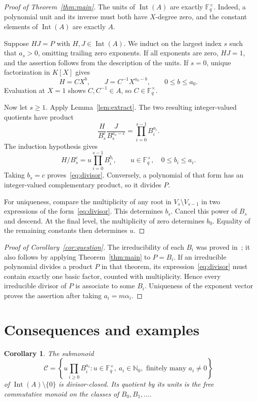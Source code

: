 \documentclass[11pt]{article}
\newtheorem{corollary}[theorem]{Corollary}
\theoremstyle{remark}
\newcommand{\Int}{\operatorname{Int}}
\newcommand{\F}{\mathbb F}
\newcommand{\Nzero}{\mathbb N_0}
\begin{document}
\begin{proof}[Proof of Theorem~\ref{thm:main}]
The units of $\Int(A)$ are exactly $\F_q^\times$. Indeed, a polynomial unit and its inverse must both have $X$-degree zero, and the constant elements of $\Int(A)$ are exactly $A$.

Suppose $HJ=P$ with $H,J\in\Int(A)$. We induct on the largest index $s$ such that $a_s>0$, omitting trailing zero exponents. If all exponents are zero, $HJ=1$, and the assertion follows from the description of the units. If $s=0$, unique factorization in $K[X]$ gives
\[
 H=CX^b,\qquad J=C^{-1}X^{a_0-b},\qquad0\leq b\leq a_0.
\]
Evaluation at $X=1$ shows $C,C^{-1}\in A$, so $C\in\F_q^\times$.

Now let $s\geq1$. Apply Lemma~\ref{lem:extract}. The two resulting integer-valued quotients have product
\[
 \frac{H}{B_s^c}\frac{J}{B_s^{a_s-c}}
 =\prod_{i=0}^{s-1}B_i^{a_i}.
\]
The induction hypothesis gives
\[
 H/B_s^c=u\prod_{i=0}^{s-1}B_i^{b_i},
 \qquad u\in\F_q^\times,\quad0\leq b_i\leq a_i.
\]
Taking $b_s=c$ proves~\eqref{eq:divisor}. Conversely, a polynomial of that form has an integer-valued complementary product, so it divides $P$.

For uniqueness, compare the multiplicity of any root in $V_s\setminus V_{s-1}$ in two expressions of the form~\eqref{eq:divisor}. This determines $b_s$. Cancel this power of $B_s$ and descend. At the final level, the multiplicity of zero determines $b_0$. Equality of the remaining constants then determines $u$.
\end{proof}

\begin{proof}[Proof of Corollary~\ref{cor:question}]
The irreducibility of each $B_i$ was proved in~\cite{TW}; it also follows by applying Theorem~\ref{thm:main} to $P=B_i$. If an irreducible polynomial divides a product $P$ in that theorem, its expression~\eqref{eq:divisor} must contain exactly one basic factor, counted with multiplicity. Hence every irreducible divisor of $P$ is associate to some $B_i$. Uniqueness of the exponent vector proves the assertion after taking $a_i=m\alpha_i$.
\end{proof}

\section{Consequences and examples}

\begin{corollary}\label{cor:monoid}
The submonoid
\[
 \mathcal C=\left\{u\prod_{i\geq0}B_i^{a_i}:
 u\in\F_q^\times,\ a_i\in\Nzero,
 \text{ finitely many }a_i\neq0\right\}
\]
of $\Int(A)\setminus\{0\}$ is divisor-closed. Its quotient by its units is the free commutative monoid on the classes of $B_0,B_1,\ldots$.
\end{corollary}
\end{document}
